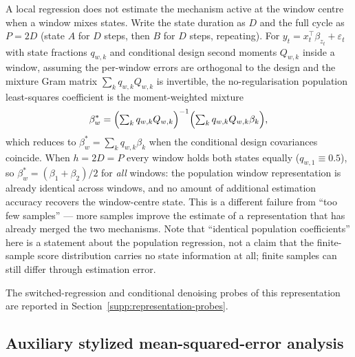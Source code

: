 \documentclass[11pt]{article}
\begin{document}
A local regression does not estimate the mechanism active at the window centre
when a window mixes states. Write the state duration as $D$ and the full cycle as
$P=2D$ (state $A$ for $D$ steps, then $B$ for $D$ steps, repeating). For
$y_t=x_t^\top\beta_{z_t}+\varepsilon_t$ with state fractions $q_{w,k}$ and
conditional design second moments $Q_{w,k}$ inside a window, assuming the
per-window errors are orthogonal to the design and the mixture Gram matrix
$\sum_k q_{w,k}Q_{w,k}$ is invertible, the no-regularisation population
least-squares coefficient is the moment-weighted mixture
\begin{equation}
\beta_w^{*}
=
\Bigl(\textstyle\sum_k q_{w,k}Q_{w,k}\Bigr)^{-1}
\Bigl(\textstyle\sum_k q_{w,k}Q_{w,k}\beta_k\Bigr),
\label{eq:window-mixture}
\end{equation}
which reduces to $\beta_w^{*}=\sum_k q_{w,k}\beta_k$ when the conditional design
covariances coincide. When $h=2D=P$ every window holds both states equally
($q_{w,1}\equiv0.5$), so $\beta_w^{*}=(\beta_1+\beta_2)/2$ for \emph{all} windows:
the population window representation is already identical across windows, and no
amount of additional estimation accuracy recovers the window-centre state. This
is a different failure from ``too few samples'' --- more samples improve the
estimate of a representation that has already merged the two mechanisms. Note
that ``identical population coefficients'' here is a statement about the
population regression, not a claim that the finite-sample score distribution
carries no state information at all; finite samples can still differ through
estimation error.

The switched-regression and conditional denoising probes of this representation are reported in Section~\ref{supp:representation-probes}.

\subsection{Auxiliary stylized mean-squared-error analysis}
\label{sec:theory}
\end{document}
